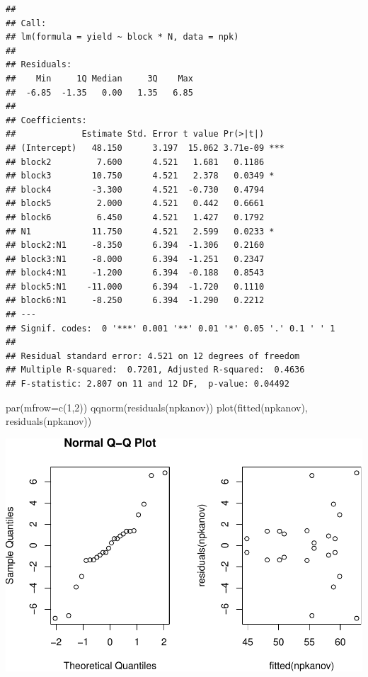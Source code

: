 \documentclass[
]{article}
\newenvironment{Shaded}{\begin{snugshade}}{\end{snugshade}}
\newcommand{\AttributeTok}[1]{\textcolor[rgb]{0.77,0.63,0.00}{#1}}
\newcommand{\DecValTok}[1]{\textcolor[rgb]{0.00,0.00,0.81}{#1}}
\newcommand{\FunctionTok}[1]{\textcolor[rgb]{0.00,0.00,0.00}{#1}}
\newcommand{\NormalTok}[1]{#1}
\begin{document}
\begin{verbatim}
## 
## Call:
## lm(formula = yield ~ block * N, data = npk)
## 
## Residuals:
##    Min     1Q Median     3Q    Max 
##  -6.85  -1.35   0.00   1.35   6.85 
## 
## Coefficients:
##             Estimate Std. Error t value Pr(>|t|)    
## (Intercept)   48.150      3.197  15.062 3.71e-09 ***
## block2         7.600      4.521   1.681   0.1186    
## block3        10.750      4.521   2.378   0.0349 *  
## block4        -3.300      4.521  -0.730   0.4794    
## block5         2.000      4.521   0.442   0.6661    
## block6         6.450      4.521   1.427   0.1792    
## N1            11.750      4.521   2.599   0.0233 *  
## block2:N1     -8.350      6.394  -1.306   0.2160    
## block3:N1     -8.000      6.394  -1.251   0.2347    
## block4:N1     -1.200      6.394  -0.188   0.8543    
## block5:N1    -11.000      6.394  -1.720   0.1110    
## block6:N1     -8.250      6.394  -1.290   0.2212    
## ---
## Signif. codes:  0 '***' 0.001 '**' 0.01 '*' 0.05 '.' 0.1 ' ' 1
## 
## Residual standard error: 4.521 on 12 degrees of freedom
## Multiple R-squared:  0.7201, Adjusted R-squared:  0.4636 
## F-statistic: 2.807 on 11 and 12 DF,  p-value: 0.04492
\end{verbatim}

\begin{Shaded}
\begin{Highlighting}[]
\FunctionTok{par}\NormalTok{(}\AttributeTok{mfrow=}\FunctionTok{c}\NormalTok{(}\DecValTok{1}\NormalTok{,}\DecValTok{2}\NormalTok{))}
\FunctionTok{qqnorm}\NormalTok{(}\FunctionTok{residuals}\NormalTok{(npkanov))}
\FunctionTok{plot}\NormalTok{(}\FunctionTok{fitted}\NormalTok{(npkanov), }\FunctionTok{residuals}\NormalTok{(npkanov))}
\end{Highlighting}
\end{Shaded}

\includegraphics{assignment_1_files/figure-latex/unnamed-chunk-28-1.pdf}
\end{document}
